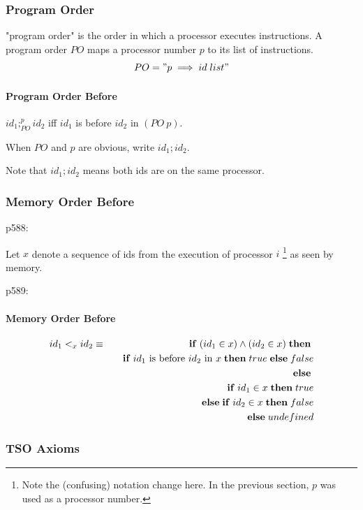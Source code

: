 \subsubsection{Program Order}

"program order" is the order in which a processor executes instructions.
A program order $PO$ maps a processor number $p$ to its list of instructions.
\begin{equation*}
   PO = "p \implies id\;list"
\end{equation*}

\paragraph{Program Order Before}

$id_1;^p_{PO} id_2$ iff $id_1$ is before $id_2$ in $(PO~p)$.

When $PO$ and $p$ are obvious, write $id_1;id_2$.

Note that $id_1;id_2$ means both ids are on the same processor.



\subsubsection{Memory Order Before}

p588:

Let $x$ denote a sequence of ids from the execution of processor $i$%
\footnote{Note the (confusing) notation change here.
In the previous section, $p$ was used as a processor number. }
as seen by memory.

p589:

\paragraph{Memory Order Before}
\begin{eqnarray*}
   id_1 <_x id_2
   &\equiv&
     \mathbf{if}\; (id_1 \in x) \land (id_2 \in x) \;\mathbf{then}\;
\\&& \quad \mathbf{if}\; id_1 \textrm{ is before } id_2 \textrm{ in } x
              \;\mathbf{then}\; true \;\mathbf{else}\; false
\\&& \;\mathbf{else}\;
\\&& \quad \mathbf{if}\; id_1 \in x \;\mathbf{then}\; true
\\&& \quad \;\mathbf{else}\; \mathbf{if}\; id_2 \in x \;\mathbf{then}\; false
\\&& \quad \;\mathbf{else}\; undefined
\end{eqnarray*}

\subsubsection{TSO Axioms}

